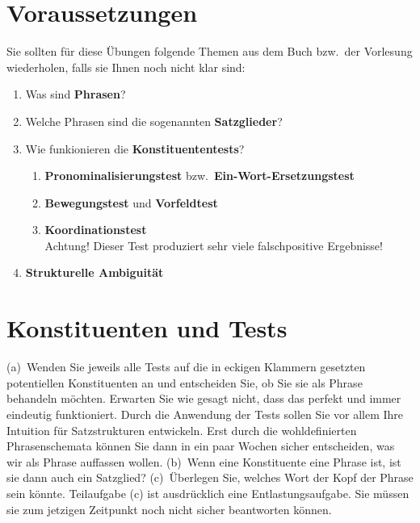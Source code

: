 \section*{Voraussetzungen}

Sie sollten für diese Übungen folgende Themen aus dem Buch bzw.\ der Vorlesung wiederholen, falls sie Ihnen noch nicht klar sind:

\begin{enumerate}\Lf
  \item Was sind \textbf{Phrasen}?
  \item Welche Phrasen sind die sogenannten \textbf{Satzglieder}?
  \item Wie funkionieren die \textbf{Konstituententests}?
    \begin{enumerate}\Lf
      \item \textbf{Pronominalisierungstest} bzw.\ \textbf{Ein-Wort-Ersetzungstest}
      \item \textbf{Bewegungstest} und \textbf{Vorfeldtest}
      \item \textbf{Koordinationstest}\\
        Achtung! Dieser Test produziert sehr viele falschpositive Ergebnisse!
    \end{enumerate}
  \item \textbf{Strukturelle Ambiguität}
\end{enumerate}

\section{Konstituenten und Tests}

(a)~Wenden Sie jeweils alle Tests auf die in eckigen Klammern gesetzten potentiellen Konstituenten an und entscheiden Sie, ob Sie sie als Phrase behandeln möchten.
Erwarten Sie wie gesagt nicht, dass das perfekt und immer eindeutig funktioniert.
Durch die Anwendung der Tests sollen Sie vor allem Ihre Intuition für Satzstrukturen entwickeln.
Erst durch die wohldefinierten Phrasenschemata können Sie dann in ein paar Wochen sicher entscheiden, was wir als Phrase auffassen wollen.
(b)~Wenn eine Konstituente eine Phrase ist, ist sie dann auch ein Satzglied?
(c)~Überlegen Sie, welches Wort der Kopf der Phrase sein könnte.
Teilaufgabe (c) ist ausdrücklich eine Entlastungsaufgabe.
Sie müssen sie zum jetzigen Zeitpunkt noch nicht sicher beantworten können.

\Halbzeile


